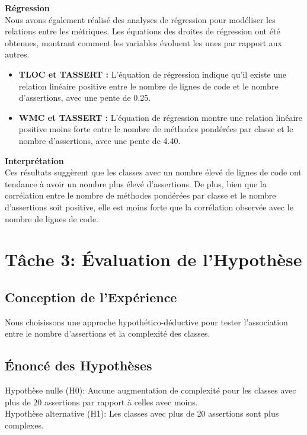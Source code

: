 \documentclass{proc}
\begin{document}
\begin{itemize}
\textbf{Régression}\\
Nous avons également réalisé des analyses de régression pour modéliser les relations entre les métriques. Les équations des droites de régression ont été obtenues, montrant comment les variables évoluent les unes par rapport aux autres.
\\
\begin{itemize}
\item \textbf{TLOC et TASSERT :} L'équation de régression indique qu'il existe une relation linéaire positive entre le nombre de lignes de code et le nombre d'assertions, avec une pente de 0.25.
\item \textbf{WMC et TASSERT :} L'équation de régression montre une relation linéaire positive moins forte entre le nombre de méthodes pondérées par classe et le nombre d'assertions, avec une pente de 4.40.
\end{itemize}

\textbf{Interprétation}\\
Ces résultats suggèrent que les classes avec un nombre élevé de lignes de code ont tendance à avoir un nombre plus élevé d'assertions. De plus, bien que la corrélation entre le nombre de méthodes pondérées par classe et le nombre d'assertions soit positive, elle est moins forte que la corrélation observée avec le nombre de lignes de code.


\section{Tâche 3: Évaluation de l'Hypothèse}

\subsection{Conception de l'Expérience}
Nous choisissons une approche hypothético-déductive pour tester l'association entre le nombre d'assertions et la complexité des classes.

\subsection{Énoncé des Hypothèses}
Hypothèse nulle (H0): Aucune augmentation de complexité pour les classes avec plus de 20 assertions par rapport à celles avec moins.\\Hypothèse alternative (H1): Les classes avec plus de 20 assertions sont plus complexes.


\end{itemize}
\end{document}
